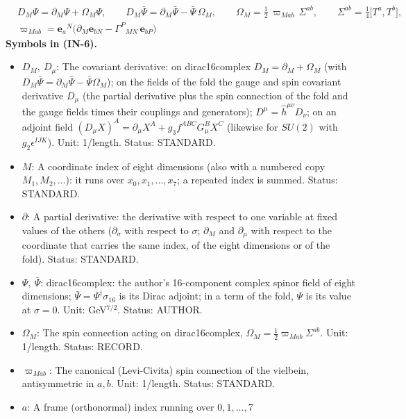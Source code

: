 \documentclass[
  10pt,
]{article}
\providecommand{\tightlist}{%
  \setlength{\itemsep}{0pt}\setlength{\parskip}{0pt}}
\begin{document}
\[
\begin{aligned}
&D_M\Psi = \partial_M\Psi + \Omega_M\Psi,\qquad D_M\bar\Psi = \partial_M\bar\Psi - \bar\Psi\,\Omega_M,\qquad
 \Omega_M = \frac12\,\varpi_{Mab}\,\Sigma^{ab},\qquad \Sigma^{ab} = \frac14\big[T^a, T^b\big],\\
&\varpi_{Mab} = \mathbf{e}_a{}^N\big(\partial_M\mathbf{e}_{bN} - \Gamma^P{}_{MN}\,\mathbf{e}_{bP}\big)
\end{aligned} \tag{IN-6}
\] \textbf{Symbols in (IN-6).}

\begin{itemize}
\tightlist
\item
  \(D_M,\ D_\mu\): The covariant derivative: on dirac16complex
  \(D_M = \partial_M + \Omega_M\) (with
  \(D_M\bar\Psi = \partial_M\bar\Psi - \bar\Psi\Omega_M\)); on the
  fields of the fold the gauge and spin covariant derivative \(D_\mu\)
  (the partial derivative plus the spin connection of the fold and the
  gauge fields times their couplings and generators);
  \(D^\mu = \hat h^{\mu\nu}D_\nu\); on an adjoint field
  \((D_\mu X)^A = \partial_\mu X^A + g_3f^{ABC}G^B_\mu X^C\) (likewise
  for \(SU(2)\) with \(g_2\epsilon^{IJK}\)). Unit: 1/length. Status:
  STANDARD.
\item
  \(M\): A coordinate index of eight dimensions (also with a numbered
  copy \(M_1, M_2, \dots\)): it runs over \(x_0, x_1, \dots, x_7\); a
  repeated index is summed. Status: STANDARD.
\item
  \(\partial\): A partial derivative: the derivative with respect to one
  variable at fixed values of the others (\(\partial_\sigma\) with
  respect to \(\sigma\); \(\partial_M\) and \(\partial_\mu\) with
  respect to the coordinate that carries the same index, of the eight
  dimensions or of the fold). Status: STANDARD.
\item
  \(\Psi,\ \bar\Psi\): dirac16complex: the author's 16-component complex
  spinor field of eight dimensions;
  \(\bar\Psi = \Psi^\dagger\sigma_{16}\) is its Dirac adjoint; in a term
  of the fold, \(\Psi\) is its value at \(\sigma = 0\). Unit:
  GeV\(^{7/2}\). Status: AUTHOR.
\item
  \(\Omega_M\): The spin connection acting on dirac16complex,
  \(\Omega_M = \frac12\varpi_{Mab}\Sigma^{ab}\). Unit: 1/length. Status:
  RECORD.
\item
  \(\varpi_{Mab}\): The canonical (Levi-Civita) spin connection of the
  vielbein, antisymmetric in \(a, b\). Unit: 1/length. Status: STANDARD.
\item
  \(a\): A frame (orthonormal) index running over \(0, 1, \dots, 7\)

\end{itemize}
\end{document}

